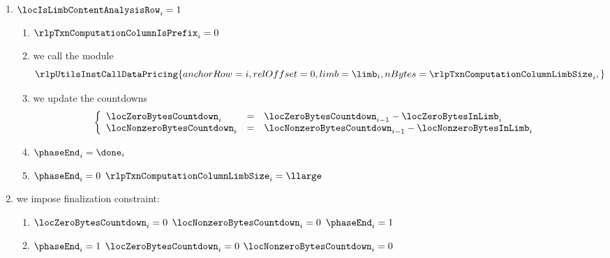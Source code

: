 \begin{enumerate}[resume]
	\item \If $\locIsLimbContentAnalysisRow _{i} = 1$ \Then
		\begin{enumerate}
			\item $\rlpTxnComputationColumnIsPrefix     _{i} = 0$
			\item we call the \rlpUtilsMod{} module
				\[
					\rlpUtilsInstCallDataPricing {
						anchorRow = i              ,
						relOffset = 0              ,
						limb      = \limb     _{i} ,
						nBytes    = \rlpTxnComputationColumnLimbSize _{i} ,
					}
				\]
			\item we update the countdowns
				\[
					\left\{ \begin{array}{lcl}
						\locZeroBytesCountdown    _{i} & = & \locZeroBytesCountdown    _{i - 1} - \locZeroBytesInLimb    _{i} \\
						\locNonzeroBytesCountdown _{i} & = & \locNonzeroBytesCountdown _{i - 1} - \locNonzeroBytesInLimb _{i} \\
					\end{array} \right.
				\]
			\item $\phaseEnd _{i} = \done _{i}$
			\item \If $\phaseEnd _{i} = 0$ \Then $\rlpTxnComputationColumnLimbSize _{i} = \llarge$
		\end{enumerate}
	\item we impose finalization constraint:
		\begin{enumerate}[resume]
			\item \If $\locZeroBytesCountdown _{i} = 0$ \et $\locNonzeroBytesCountdown _{i} = 0$ \Then $\phaseEnd _{i} = 1$
			\item \If $\phaseEnd _{i} = 1$ \Then $\locZeroBytesCountdown _{i} = 0$ \et   $\locNonzeroBytesCountdown _{i} = 0$
		\end{enumerate}
\end{enumerate}


